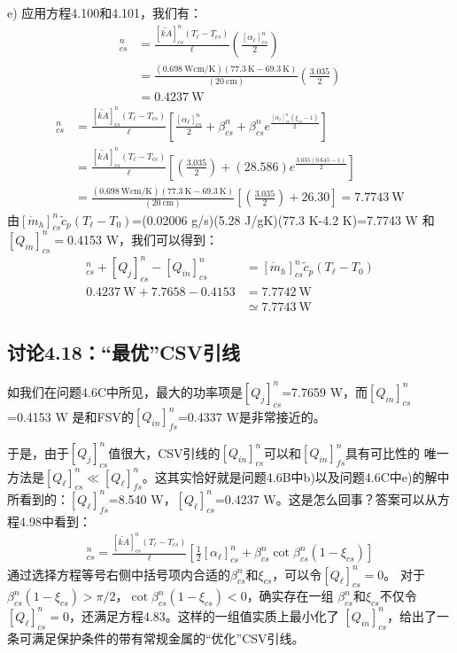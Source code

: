 e) 应用方程4.100和4.101，我们有：
\begin{align*}%
[Q_\ell]_{cs}^{n}&=\frac{[\tilde{kA}]_{cs}^{n}(T_\ell-T_{cs})}{\ell}\left(\frac{[\alpha_\ell]_{cs}^{n}}{2}\right) \\ \tag{4.100}
&=\frac{(0.698\ \mathrm{W cm/K})(77.3\ \mathrm{K}-69.3\ \mathrm{K})}{(20\ \mathrm{cm})}\left(\frac{3.035}{2}\right)\\
&=0.4237\ \mathrm{W}
\end{align*}
\begin{align*}%
[Q_j]_{cs}^{n}&=\frac{[\tilde{kA}]_{cs}^{n}(T_\ell-T_{cs})}{\ell}\left[\frac{[\alpha_\ell]_{cs}^{n}}{2}+\beta_{cs}^{n}+\beta_{cs}^{n}e^{\frac{[\alpha_\ell]_{cs}^{n}(\xi_{cs}-1)}{2}}\right] \\\tag{4.101}
&=\frac{[\tilde{kA}]_{cs}^{n}(T_\ell-T_{cs})}{\ell}\left[\left(\frac{3.035}{2}\right)+(28.586)e^{\frac{3.035(0.645-1)}{2}}\right] \\
&=\frac{(0.698\ \mathrm{W cm/K})(77.3\ \mathrm{K}-69.3\ \mathrm{K})}{(20\ \mathrm{cm})}\left[\left(\frac{3.035}{2}\right)+26.30\right]=7.7743\ \mathrm{W}
\end{align*}
由$[\dot{m}_h]_{cs}^{n}\tilde{c}_p(T_\ell-T_0)$=(0.02006 g/s)(5.28 J/gK)(77.3 K-4.2 K)=7.7743 W
和$[Q_{in}]_{cs}^{n}=$0.4153 W，我们可以得到：
\begin{align*}%
[Q_\ell]_{cs}^{n}+[Q_j]_{cs}^{n}-[Q_{in}]_{cs}^{n}&=[\dot{m}_h]_{cs}^{n}\tilde{c}_p(T_\ell-T_0)\\\tag{4.97}
0.4237\ \mathrm{W}+7.7658-0.4153&=7.7742\ \mathrm{W} \\
&\simeq 7.7743\ \mathrm{W}             
\end{align*}


\subsection{讨论4.18：“最优”CSV引线}
如我们在问题4.6C中所见，最大的功率项是$[Q_j]_{cs}^n$=7.7659 W，而$[Q_{in}]_{cs}^n$=0.4153 W
是和FSV的$[Q_{in}]_{fs}^n$=0.4337 W是非常接近的。

于是，由于$[Q_j]_{cs}^n$值很大，CSV引线的$[Q_{in}]_{cs}^n$可以和$[Q_{in}]_{fs}^n$具有可比性的
唯一方法是$[Q_{\ell}]_{cs}^n\ll [Q_{\ell}]_{fs}^n$。这其实恰好就是问题4.6B中b)以及问题4.6C中e)的解中所看到的：$[Q_{\ell}]_{fs}^n$=8.540 W，$[Q_{\ell}]_{cs}^n$=0.4237 W。这是怎么回事？答案可以从方程4.98中看到：
\begin{align*}%
[Q_\ell]_{cs}^{n}=\frac{[\tilde{kA}]_{cs}^{n}(T_\ell-T_{cs})}{\ell}\left[\frac{1}{2}[\alpha_\ell]_{cs}^{n}+\beta_{cs}^{n}\cot\beta_{cs}^{n}(1-\xi_{cs})\right] \tag{4.98}
\end{align*}
通过选择方程等号右侧中括号项内合适的$\beta_{cs}^n$和$\xi_{cs}$，可以令$[Q_\ell]_{cs}^{n}=0$。
对于$\beta_{cs}^{n}(1-\xi_{cs})>\pi/2$，$\cot\beta_{cs}^{n}(1-\xi_{cs})<0$，确实存在一组
$\beta_{cs}^n$和$\xi_{cs}$不仅令$[Q_\ell]_{cs}^{n}=0$，还满足方程4.83。这样的一组值实质上最小化了
$[Q_{in}]_{cs}^n$，给出了一条可满足保护条件的带有常规金属的“优化”CSV引线。

